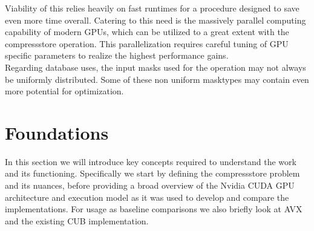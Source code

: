 \documentclass{tudscrreprt}
\begin{document}
		Viability of this relies heavily on fast runtimes for a procedure designed to save even more time overall. Catering to this need is the massively parallel computing capability of modern GPUs, which can be utilized to a great extent with the compressstore operation. This parallelization requires careful tuning of GPU specific parameters to realize the highest performance gains. \\
		
		Regarding database uses, the input masks used for the operation may not always be uniformly distributed. Some of these non uniform masktypes may contain even more potential for optimization. \\
		
	\chapter{Foundations}
		In this section we will introduce key concepts required to understand the work and its functioning. Specifically we start by defining the compressstore problem and its nuances, before providing a broad overview of the Nvidia CUDA GPU architecture and execution model as it was used to develop and compare the implementations. For usage as baseline comparisons we also briefly look at AVX and the existing CUB implementation.
	
\end{document}
